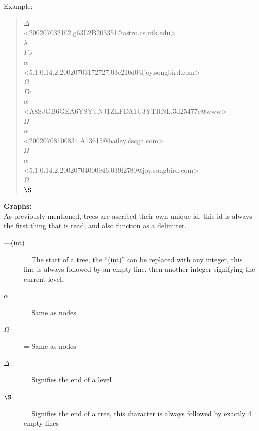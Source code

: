 \documentclass[a4paper,english]{report}
\begin{document}
\noindent
Example:

\begin{quotation}

\noindent
\( \Delta \)\\
<200207032102.g63L2B203351@astro.cs.utk.edu>\\
\( \lambda \)\\
\( \Gamma \)p\\
\( \alpha \)\\
<5.1.0.14.2.20020703172727.03e210d0@joy.songbird.com>\\
\( \Omega \)\\
\( \Gamma \)c\\
\( \alpha \)\\
<A8SJGB6GEA6YSYUNJ1ZLFDA1U3YTRNL.3d25477c@www>\\
\( \Omega \)\\
\( \alpha \)\\
<20020708100834.A13615@bailey.dscga.com>\\
\( \Omega \)\\
\( \alpha \)\\
<5.1.0.14.2.20020704000946.039f2780@joy.songbird.com>\\
\( \Omega \)\\
\( \S \) \\

\end{quotation}

\textbf{Graphs:}\\

As previously mentioned, trees are ascribed their own unique id, this id is always the first thing that is read, and also function as a delimiter.

\begin{description}


\item[---(int)] = The start of a tree, the “(int)” can be replaced with any integer, this line is always followed by an empty line, then another integer signifying the current level.\\

\item[\( \alpha \)] = Same as nodes \\


\item[\( \Omega \)] = Same as nodes\\


\item[\( \Delta \)] = Signifies the end of a level \\


\item[\( \S \)] = Signifies the end of a tree, this character is always followed by exactly 4 empty lines 

\end{description}
\end{document}

